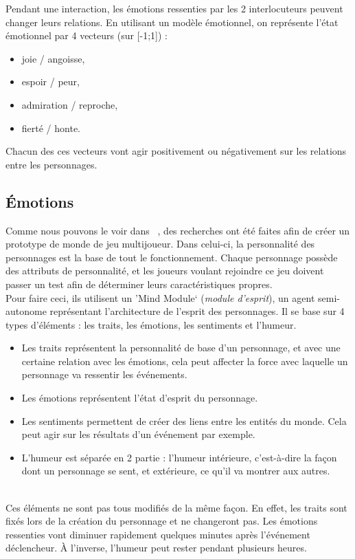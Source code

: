 \documentclass[asi]{picINSA}
\begin{document}
Pendant une interaction, les émotions ressenties par les 2 interlocuteurs peuvent changer leurs relations. En utilisant un modèle émotionnel, on représente l'état émotionnel par 4 vecteurs (sur [-1;1]) :
\begin{itemize}
\item joie / angoisse,
\item espoir / peur,
\item admiration / reproche,
\item fierté / honte.
\end{itemize}
Chacun des ces vecteurs vont agir positivement ou négativement sur les relations entre les personnages.

\subsection{Émotions}

Comme nous pouvons le voir dans ~\cite{IRIS:conf/aiide/Eladhari2010}, des recherches ont été faites afin de créer un prototype de monde de jeu multijoueur. Dans celui-ci, la personnalité des personnages est la base de tout le fonctionnement. Chaque personnage possède des attributs de personnalité, et les joueurs voulant rejoindre ce jeu doivent passer un test afin de déterminer leurs caractéristiques propres.\\

Pour faire ceci, ils utilisent un \rq{}Mind Module\lq{} (\textit{module d'esprit}), un agent semi-autonome représentant l'architecture de l'esprit des personnages. Il se base sur 4 types d'éléments : les traits, les émotions, les sentiments et l'humeur.\\
\begin{itemize}
\item Les traits représentent la personnalité de base d'un personnage, et avec une certaine relation avec les émotions, cela peut affecter la force avec laquelle un personnage va ressentir les événements.
\item Les émotions représentent l'état d'esprit du personnage.
\item Les sentiments permettent de créer des liens entre les entités du monde. Cela peut agir sur les résultats d'un événement par exemple.
\item L'humeur est séparée en 2 partie : l'humeur intérieure, c'est-à-dire la façon dont un personnage se sent, et extérieure, ce qu'il va montrer aux autres.
\end{itemize}
~\\
Ces éléments ne sont pas tous modifiés de la même façon. En effet, les traits sont fixés lors de la création du personnage et ne changeront pas. Les émotions ressenties vont diminuer rapidement quelques minutes après l'événement déclencheur. À l'inverse, l'humeur peut rester pendant plusieurs heures.
\end{document}
